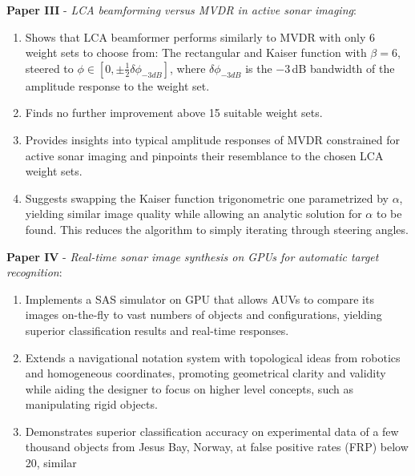 \textbf{Paper III} - \textit{LCA beamforming versus MVDR in active sonar imaging}:
\begin{enumerate}
\item Shows that LCA beamformer performs similarly to MVDR with only 6 weight sets to choose from: The rectangular and Kaiser function with $\beta=6$, steered to $\phi\in[0,\pm\frac{1}{2}\delta{\phi_{-3dB}}]$, where $\delta{\phi_{-3dB}}$ is the $-3$\,dB bandwidth of the amplitude response to the weight set.
\item Finds no further improvement above 15 suitable weight sets.
\item Provides insights into typical amplitude responses of MVDR constrained for active sonar imaging and pinpoints their resemblance to the chosen LCA weight sets. 
\item Suggests swapping the Kaiser function trigonometric one parametrized by $\alpha$, yielding similar image quality while allowing an analytic solution for $\alpha$ to be found. This reduces the algorithm to simply iterating through steering angles.
\end{enumerate}

\textbf{Paper IV} - \textit{Real-time sonar image synthesis on GPUs for automatic target recognition}:
\begin{enumerate}
\item Implements a SAS simulator on GPU that allows AUVs to compare its images on-the-fly to vast numbers of objects and configurations, yielding superior classification results and real-time responses.
\item Extends a navigational notation system with topological ideas from robotics and homogeneous coordinates, promoting geometrical clarity and validity while aiding the designer to focus on higher level concepts, such as manipulating rigid objects.
\item Demonstrates superior classification accuracy on experimental data of a few thousand objects from Jesus Bay, Norway, at false positive rates (FRP) below 20, similar %
\end{enumerate}


